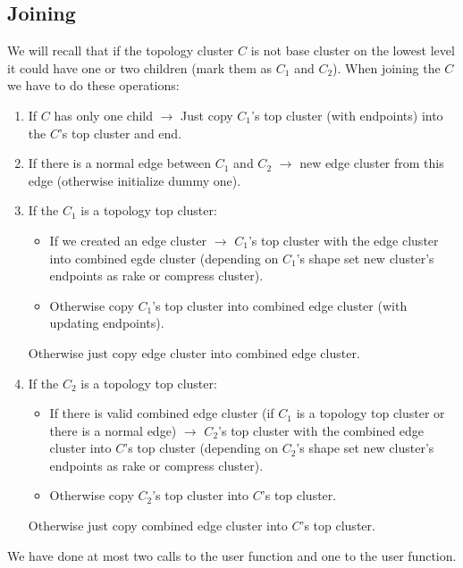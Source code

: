 \subsection{Joining}

We will recall that if the topology cluster $C$ is not base cluster on the
lowest level it could have one or two children (mark them as $C_1$ and $C_2$).
When joining the $C$ we have to do these operations:
\begin{enumerate}

\item If $C$ has only one child $\rightarrow$ Just copy $C_1$'s {\I top cluster}
(with endpoints) into the $C$'s {\I top cluster} and end.

\item If there is a normal edge between $C_1$ and $C_2$ $\rightarrow$ \Create{}
new {\I edge cluster} from this edge (otherwise initialize dummy one).

\item If the $C_1$ is a topology top cluster:
\begin{itemize}
\item If we created an {\I edge cluster} $\rightarrow$ \Join{} $C_1$'s {\I top
cluster} with the {\I edge cluster} into {\I combined egde cluster} (depending
on $C_1$'s shape set new cluster's endpoints as rake or compress cluster).
\item Otherwise copy $C_1$'s {\I top cluster} into {\I combined edge cluster}
(with updating endpoints).
\end{itemize}
Otherwise just copy {\I edge cluster} into {\I combined edge cluster}.

\item If the $C_2$ is a topology top cluster:
\begin{itemize}
\item If there is valid {\I combined edge cluster} (if $C_1$ is a topology top
cluster or there is a normal edge) $\rightarrow$ \Join{} $C_2$'s {\I top cluster}
with the {\I combined edge cluster} into $C$'s {\I top cluster} (depending
on $C_2$'s shape set new cluster's endpoints as rake or compress cluster).
\item Otherwise copy $C_2$'s {\I top cluster} into $C$'s {\I top cluster}.
\end{itemize}
Otherwise just copy {\I combined edge cluster} into $C$'s {\I top cluster}.

\end{enumerate}

We have done at most two calls to the \Join{} user function and one to the
\Create{} user function.

